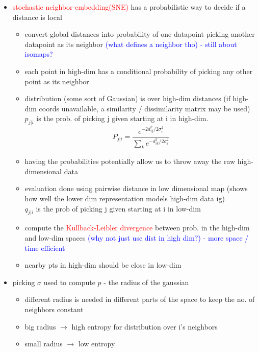 \documentclass[font=12pt]{article}
\begin{document}
\begin{itemize}
		\item \textcolor{red}{stochastic neighbor embedding(SNE)} has a probabilistic way to decide if a distance is local
			\begin{itemize}
				\item convert global distances into probability of one datapoint picking another datapoint as its neighbor \textcolor{blue}{(what defines a neighbor tho) - still about isomaps?}
				\item each point in high-dim has a conditional probability of picking any other point as its neighbor
			\item distribution (some sort of Gaussian) is over high-dim distances (if high-dim coords unavailable, a similarity / dissimilarity matrix may be used)\\ $p_{j|i}$ is the prob. of picking j given starting at i in high-dim.
				\[ P_{j|i} = \frac{e^{-2d_{ij}^2 / 2\sigma_i^2}}{\sum_k e^{{-d_{ik}^2}/{2\sigma_i^2}}} \]
				\item having the probabilities potentially allow us to throw away the raw high-dimensional data
				\item evaluation done using pairwise distance in low dimensional map (shows how well the lower dim representation models high-dim data ig)\\
					$q_{j|i}$ is the prob of picking j given starting at i in low-dim
				\item compute the \textcolor{red}{Kullback-Leibler divergence} between prob. in the high-dim and low-dim spaces \textcolor{blue}{(why not just use dist in high dim?) - more space / time efficient}
				\item nearby pts in high-dim should be close in low-dim
			\end{itemize}
		\item picking $\sigma$ used to compute  $p$ - the radius of the gaussian
			 \begin{itemize}
				 \item different radius is needed in different parts of the space to keep the no. of neighbors constant
				 \item big radius $\rightarrow$ high entropy for distribution over i's neighbors
				 \item small radius $\rightarrow$ low entropy
				

\end{itemize}
\end{itemize}
\end{document}

